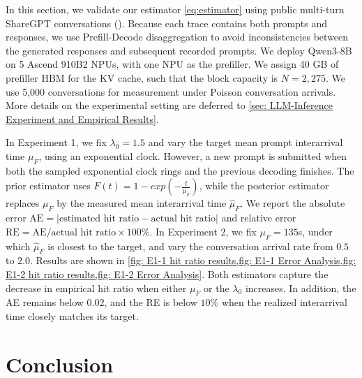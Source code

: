\documentclass{article}
\theoremstyle{definition}
\newcommand{\chutong}[1]{[\textcolor{red}{Chutong: #1}]}
\begin{document}
In this section, we validate our estimator \eqref{eq:estimator} using public multi-turn ShareGPT conversations (\cite{sharegpt_vicuna_unfiltered}). Because each trace contains both prompts and responses, we use Prefill-Decode disaggregation to avoid inconsistencies between the generated responses and subsequent recorded prompts. We deploy Qwen3-8B on 5 Ascend 910B2 NPUs, with one NPU as the prefiller.
We assign 40 GB of prefiller HBM for the KV cache, such that the block capacity is $N=2,275$. We use 5,000 conversations for measurement under Poisson conversation arrivals. More details on the experimental setting are deferred to \cref{sec: LLM-Inference Experiment and Empirical Results}.

In Experiment 1, we fix $\lambda_0=1.5$ and vary the target mean prompt interarrival time $\mu_F$, using an exponential clock. However, a new prompt is submitted when both the sampled exponential clock rings and the previous decoding finishes. The prior estimator uses $F(t)=1-exp(-\frac{t}{\mu_F})$, while the posterior estimator replaces $\mu_F$ by the measured mean interarrival time $\hat{\mu}_F$. We report the absolute error $\mathrm{AE}=|\text{estimated hit ratio}-\text{actual hit ratio}|$ and relative error $\mathrm{RE}=\mathrm{AE}/\text{actual hit ratio}\times100\%$. In Experiment 2, we fix $\mu_F=135$s, under which $\hat{\mu}_F$ is closest to the target, and vary the conversation arrival rate from $0.5$ to $2.0$. Results are shown in \cref{fig: E1-1 hit ratio results,fig: E1-1 Error Analysis,fig: E1-2 hit ratio results,fig: E1-2 Error Analysis}. Both estimators capture the decrease in empirical hit ratio when either $\mu_F$ or the $\lambda_0$ increases. In addition, the AE remains below $0.02$, and the RE is below $10\%$ when the realized interarrival time closely matches its target.


\vspace{-0.5em}
\vspace{-0.5em}

\section{Conclusion}
\vspace{-0.5em}
\vspace{-0.2em}
\end{document}
